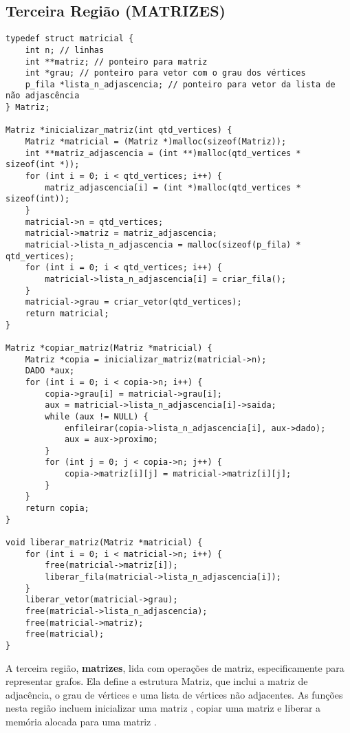 \documentclass[12pt, openright, oneside, a4paper, chapter=TITLE, section=TITLE, subsection=TITLE, subsubsection=TITLE, brazil]{abntex2}
\newenvironment{codebox}%
  {\begin{mdframed}[backgroundcolor=gray!5, linecolor=gray, roundcorner=5pt]}%
  {\end{mdframed}}
\begin{document}
\subsection{Terceira Região (MATRIZES)}
\begin{codebox}
\begin{verbatim}
typedef struct matricial {
    int n; // linhas
    int **matriz; // ponteiro para matriz
    int *grau; // ponteiro para vetor com o grau dos vértices
    p_fila *lista_n_adjascencia; // ponteiro para vetor da lista de não adjascência
} Matriz;

Matriz *inicializar_matriz(int qtd_vertices) {
    Matriz *matricial = (Matriz *)malloc(sizeof(Matriz));
    int **matriz_adjascencia = (int **)malloc(qtd_vertices * sizeof(int *));
    for (int i = 0; i < qtd_vertices; i++) {
        matriz_adjascencia[i] = (int *)malloc(qtd_vertices * sizeof(int));
    }
    matricial->n = qtd_vertices;
    matricial->matriz = matriz_adjascencia;
    matricial->lista_n_adjascencia = malloc(sizeof(p_fila) * qtd_vertices);
    for (int i = 0; i < qtd_vertices; i++) {
        matricial->lista_n_adjascencia[i] = criar_fila();
    }
    matricial->grau = criar_vetor(qtd_vertices);
    return matricial;
}

Matriz *copiar_matriz(Matriz *matricial) {
    Matriz *copia = inicializar_matriz(matricial->n);
    DADO *aux;
    for (int i = 0; i < copia->n; i++) {
        copia->grau[i] = matricial->grau[i];
        aux = matricial->lista_n_adjascencia[i]->saida;
        while (aux != NULL) {
            enfileirar(copia->lista_n_adjascencia[i], aux->dado);
            aux = aux->proximo;
        }
        for (int j = 0; j < copia->n; j++) {
            copia->matriz[i][j] = matricial->matriz[i][j];
        }
    }
    return copia;
}

void liberar_matriz(Matriz *matricial) {
    for (int i = 0; i < matricial->n; i++) {
        free(matricial->matriz[i]);
        liberar_fila(matricial->lista_n_adjascencia[i]);
    }
    liberar_vetor(matricial->grau);
    free(matricial->lista_n_adjascencia);
    free(matricial->matriz);
    free(matricial);
}
\end{verbatim}
\end{codebox}
\hspace{1.25cm}A terceira região, \textbf{matrizes}, lida com operações de matriz, especificamente para representar grafos. Ela define a estrutura Matriz, que inclui a matriz de adjacência, o grau de vértices e uma lista de vértices não adjacentes. As funções nesta região incluem inicializar uma matriz , copiar uma matriz  e liberar a memória alocada para uma matriz .
\end{document}

